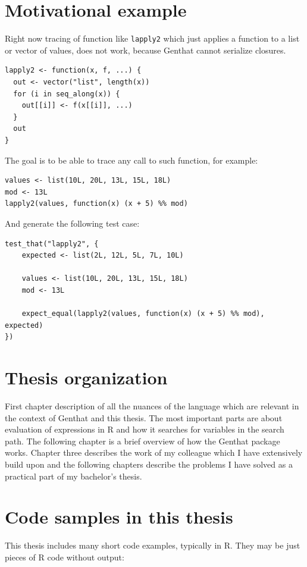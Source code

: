 \documentclass[thesis=B,english]{FITthesis}[2012/10/20]
\begin{document}
\section{Motivational example}
Right now tracing of function like \verb|lapply2|\cite{advR} which just applies a function to a list or vector of values, does not work, because Genthat cannot serialize closures.

\begin{verbatim}
lapply2 <- function(x, f, ...) {
  out <- vector("list", length(x))
  for (i in seq_along(x)) {
    out[[i]] <- f(x[[i]], ...)
  }
  out
}
\end{verbatim}

The goal is to be able to trace any call to such function, for example:

\begin{verbatim}
values <- list(10L, 20L, 13L, 15L, 18L)
mod <- 13L
lapply2(values, function(x) (x + 5) %% mod)
\end{verbatim}

And generate the following test case:

\begin{verbatim}
test_that("lapply2", {
    expected <- list(2L, 12L, 5L, 7L, 10L)

    values <- list(10L, 20L, 13L, 15L, 18L)
    mod <- 13L

    expect_equal(lapply2(values, function(x) (x + 5) %% mod), expected)
})
\end{verbatim}



\section{Thesis organization}
 First chapter description of all the nuances of the language which are relevant in the context of Genthat and this thesis. The most important parts are about evaluation of expressions in R and how it searches for variables in the search path. The following chapter is a brief overview of how the Genthat package works. Chapter three describes the work of my colleague which I have extensively build upon and the following chapters describe the problems I have solved as a practical part of my bachelor’s thesis. 

\section{Code samples in this thesis}
This thesis includes many short code examples, typically in R. They may be just pieces of R code without output:
\end{document}

